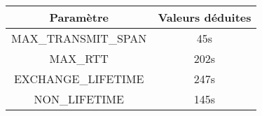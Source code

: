 \begin{table}
\begin{center}
\begin{tabular}{|c|c|}
\hline
 \rowcolor{purple!10} Paramètre & Valeurs déduites  \\ \hline \hline
 MAX\_TRANSMIT\_SPAN & 45s \\ \hline
 MAX\_RTT & 202s \\ \hline \hline
 EXCHANGE\_LIFETIME & 247s \\ \hline
 NON\_LIFETIME & 145s \\ \hline

\end{tabular}
\end{center}
\label{tab-data-rate}
\end{table}


